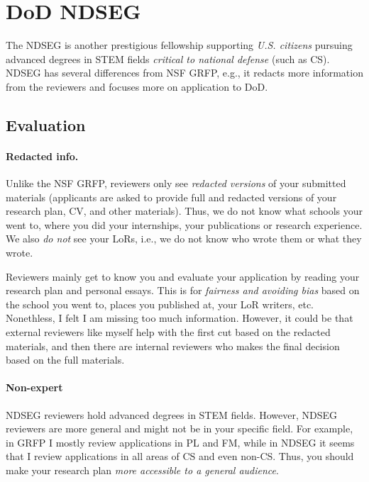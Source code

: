 \documentclass[oneside,11pt,dvipsnames]{book}
\begin{document}
\section{DoD NDSEG}

The NDSEG is another prestigious fellowship supporting \emph{U.S. citizens} pursuing advanced degrees in STEM fields \emph{critical to national defense} (such as CS). NDSEG has several differences from NSF GRFP, e.g., it redacts more information from the reviewers and focuses more on application to DoD.


\subsection{Evaluation}

\paragraph{Redacted info.} Unlike the NSF GRFP, reviewers only see \emph{redacted versions} of your submitted materials (applicants are asked to provide full and redacted versions of your research plan, CV, and other materials). Thus, we do not know what schools your went to, where you did your internships, your publications or research experience. We also \emph{do not} see your LoRs, i.e., we do not know who wrote them or what they wrote. 

Reviewers mainly get to know you and evaluate your application by reading your research plan and personal essays. This is for \emph{fairness and avoiding bias} based on the school you went to, places you published at, your LoR writers, etc.  Nonethless, I felt I am missing too much information. However, it could be that external reviewers like myself help with the first cut based on the redacted materials, and then there are internal reviewers who makes the final decision based on the full materials. 

\paragraph{Non-expert} NDSEG reviewers hold advanced degrees in STEM fields. However, NDSEG reviewers are more general and might not be in your specific field. For example, in GRFP I mostly review applications in PL and FM, while in NDSEG it seems that I review applications in all areas of CS and even non-CS.  Thus, you should make your research plan \emph{more accessible to a general audience}.
\end{document}
